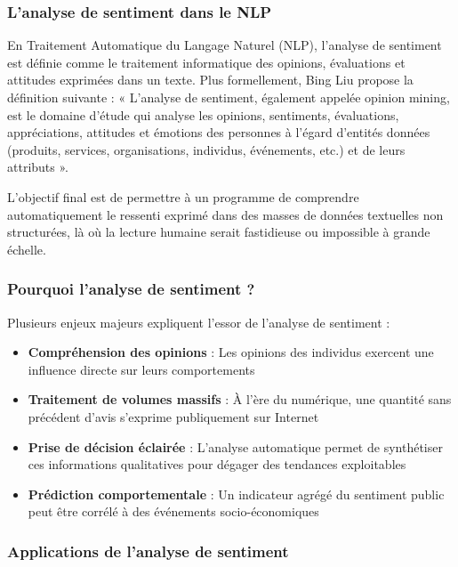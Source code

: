 \subsubsection{L'analyse de sentiment dans le NLP}

En Traitement Automatique du Langage Naturel (NLP), l'analyse de sentiment est définie comme le traitement informatique des opinions, évaluations et attitudes exprimées dans un texte. Plus formellement, Bing Liu propose la définition suivante : « L'analyse de sentiment, également appelée opinion mining, est le domaine d'étude qui analyse les opinions, sentiments, évaluations, appréciations, attitudes et émotions des personnes à l'égard d'entités données (produits, services, organisations, individus, événements, etc.) et de leurs attributs ».

L'objectif final est de permettre à un programme de comprendre automatiquement le ressenti exprimé dans des masses de données textuelles non structurées, là où la lecture humaine serait fastidieuse ou impossible à grande échelle.

\subsubsection{Pourquoi l'analyse de sentiment ?}

Plusieurs enjeux majeurs expliquent l'essor de l'analyse de sentiment :

\begin{itemize}
    \item \textbf{Compréhension des opinions} : Les opinions des individus exercent une influence directe sur leurs comportements
    \item \textbf{Traitement de volumes massifs} : À l'ère du numérique, une quantité sans précédent d'avis s'exprime publiquement sur Internet
    \item \textbf{Prise de décision éclairée} : L'analyse automatique permet de synthétiser ces informations qualitatives pour dégager des tendances exploitables
    \item \textbf{Prédiction comportementale} : Un indicateur agrégé du sentiment public peut être corrélé à des événements socio-économiques
\end{itemize}

\subsubsection{Applications de l'analyse de sentiment}


